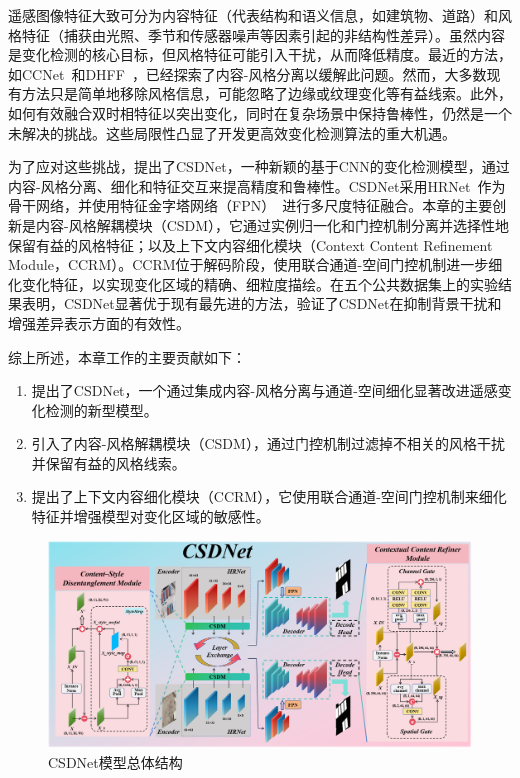 遥感图像特征大致可分为内容特征（代表结构和语义信息，如建筑物、道路）和风格特征（捕获由光照、季节和传感器噪声等因素引起的非结构性差异）。虽然内容是变化检测的核心目标，但风格特征可能引入干扰，从而降低精度。最近的方法，如CCNet~\cite{cheng2024harmony}和DHFF~\cite{jiang2020change}，已经探索了内容-风格分离以缓解此问题。然而，大多数现有方法只是简单地移除风格信息，可能忽略了边缘或纹理变化等有益线索。此外，如何有效融合双时相特征以突出变化，同时在复杂场景中保持鲁棒性，仍然是一个未解决的挑战。这些局限性凸显了开发更高效变化检测算法的重大机遇。

为了应对这些挑战，提出了CSDNet，一种新颖的基于CNN的变化检测模型，通过内容-风格分离、细化和特征交互来提高精度和鲁棒性。CSDNet采用HRNet~\cite{Wang2019DeepHR}作为骨干网络，并使用特征金字塔网络（FPN）~\cite{lin_feature_2017}进行多尺度特征融合。本章的主要创新是内容-风格解耦模块（CSDM），它通过实例归一化和门控机制分离并选择性地保留有益的风格特征；以及上下文内容细化模块（Context Content Refinement Module，CCRM）。CCRM位于解码阶段，使用联合通道-空间门控机制进一步细化变化特征，以实现变化区域的精确、细粒度描绘。在五个公共数据集上的实验结果表明，CSDNet显著优于现有最先进的方法，验证了CSDNet在抑制背景干扰和增强差异表示方面的有效性。



综上所述，本章工作的主要贡献如下：

\begin{enumerate}[label=(\arabic*)]
\item 提出了CSDNet，一个通过集成内容-风格分离与通道-空间细化显著改进遥感变化检测的新型模型。
\item 引入了内容-风格解耦模块（CSDM），通过门控机制过滤掉不相关的风格干扰并保留有益的风格线索。
\item 提出了上下文内容细化模块（CCRM），它使用联合通道-空间门控机制来细化特征并增强模型对变化区域的敏感性。
\end{enumerate}

\begin{figure}[!htbp]
	\centering
	\includegraphics[width=\textwidth]{paper_figures/基于双时相遥感影像风格解缠和内容细化增强遥感变化检测方法/CSDNet.png}
	\caption{CSDNet模型总体结构}
	\label{fig:CSDNet}
\end{figure}



